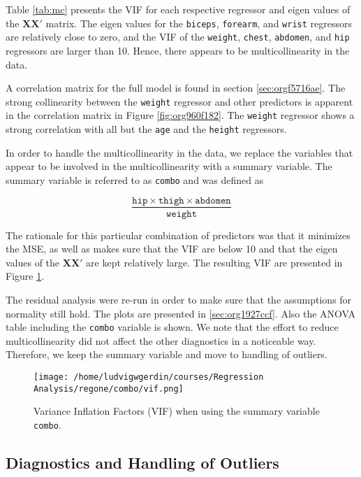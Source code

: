 \documentclass[11pt]{article}
\begin{document}
Table \ref{tab:mc} presents the VIF for each respective regressor and eigen values of the
\(\textbf{X}\textbf{X}'\) matrix. The eigen values for the 
\texttt{biceps}, \texttt{forearm}, and \texttt{wrist} regressors are relatively close to zero, and the
VIF of the \texttt{weight}, \texttt{chest}, \texttt{abdomen}, and \texttt{hip} regressors are larger than 10.
Hence, there appears to be multicollinearity in the data.

A correlation matrix for the full model is found in section \ref{sec:orgf5716ae}. The strong collinearity
between the \texttt{weight} regressor and other predictors is apparent in the correlation matrix in Figure
\ref{fig:org960f182}. The \texttt{weight} regressor shows a strong correlation with all but the \texttt{age} and
the \texttt{height} regressors.

In order to handle the multicollinearity in the data, we replace the variables that appear to be involved 
in the multicollinearity with a summary variable. \cite{Montgomery2012} The summary variable is referred to as
\texttt{combo} and was defined as

\[
   \frac{\texttt{hip}\times\texttt{thigh}\times\texttt{abdomen}}{\texttt{weight}}   
   \]

The rationale for this particular combination of predictors was that it minimizes the MSE, as well as makes sure
that the VIF are below 10 and that the eigen values of the \(\textbf{X}\textbf{X}'\) are kept relatively 
large. The resulting VIF are presented in Figure \ref{fig:org4a4db62}. 

The residual analysis were re-run in order to make sure that the assumptions for normality still hold.
The plots are presented in \ref{sec:org1927ccf}. Also the ANOVA table including the \texttt{combo} variable 
is shown. We note that the effort to reduce multicollinearity did not affect the
other diagnostics in a noticeable way. Therefore, we keep the summary variable and move to handling of outliers.

 

\begin{figure}[htbp]
\centering
\texttt{[image: /home/ludvigwgerdin/courses/Regression Analysis/regone/combo/vif.png]}
\caption{\label{fig:org4a4db62}
Variance Inflation Factors (VIF) when using the summary variable \texttt{combo}.}
\end{figure}   

\subsection{Diagnostics and Handling of Outliers}
\label{sec:org74f6cf8}
\end{document}
